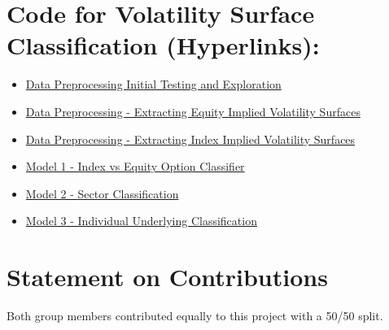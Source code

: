\documentclass[10pt]{article}
\begin{document}
\section{Code for Volatility Surface Classification (Hyperlinks):}

\begin{itemize}
  \item \href{https://colab.research.google.com/drive/1RPZpqyt33PQb9ZkAlst8CjZph5h1zgBK?usp=sharing}{Data Preprocessing Initial Testing and Exploration}
  \item \href{https://colab.research.google.com/drive/1PO-9FZiYK0rzfPjc7jJBSP_qxUhoOPxs?usp=sharing}{Data Preprocessing - Extracting Equity Implied Volatility Surfaces}
  \item \href{https://colab.research.google.com/drive/1moMm0MVd46vPRBijcpB2r7ZE3xOhrWAT?usp=sharing}{Data Preprocessing - Extracting Index Implied Volatility Surfaces}
  \item \href{https://colab.research.google.com/drive/128uu0wZXvBpfcqyY2Le41YxMySnyBIXk?usp=sharing}{Model 1 - Index vs Equity Option Classifier}
  \item \href{https://colab.research.google.com/drive/1e-zCuNWVzXSWbTsUch87-hY_tp_T7Boy?usp=sharing}{Model 2 - Sector Classification}
  \item \href{https://colab.research.google.com/drive/16w8rRRtv4U_B2WVU_WHdnCJxcheVtrpB?usp=sharing}{Model 3 - Individual Underlying Classification}
\end{itemize}

\section{Statement on Contributions}

Both group members contributed equally to this project with a 50/50 split.
\end{document}
